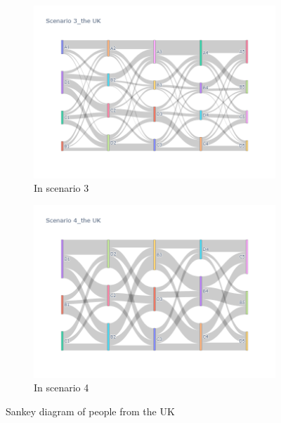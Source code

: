 \begin{figure}[h]
\begin{subfigure}{0.5\textwidth}
    \includegraphics[width=\linewidth]{Figure/figure35c.png}
    \caption{In scenario 3}
    \label{fig35c}
  \end{subfigure}
  \begin{subfigure}{0.5\textwidth}
    \centering
    \includegraphics[width=\linewidth]{Figure/figure35d.png}
    \caption{In scenario 4}
    \label{fig35d}
  \end{subfigure}
  \caption{ Sankey diagram of people from the UK}
  \label{fig35}
\end{figure}


